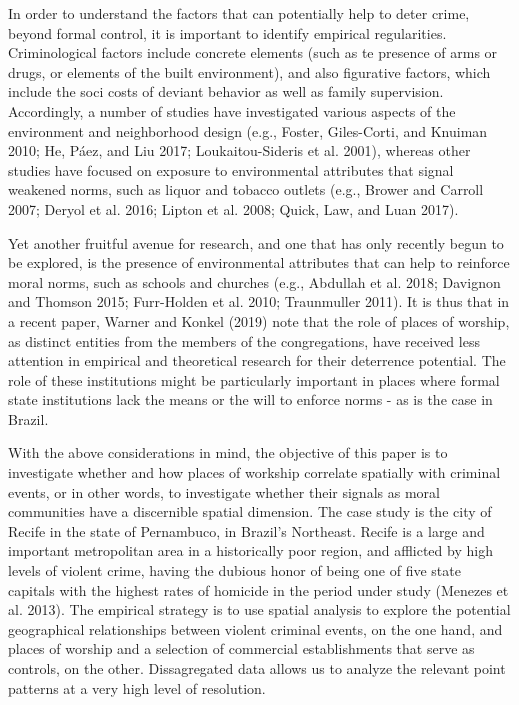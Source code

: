 \documentclass[smallextended]{svjour3}       %
\begin{document}
In order to understand the factors that can potentially help to deter
crime, beyond formal control, it is important to identify empirical
regularities. Criminological factors include concrete elements (such as
te presence of arms or drugs, or elements of the built environment), and
also figurative factors, which include the soci costs of deviant
behavior as well as family supervision. Accordingly, a number of studies
have investigated various aspects of the environment and neighborhood
design (e.g., Foster, Giles-Corti, and Knuiman 2010; He, Páez, and Liu
2017; Loukaitou-Sideris et al. 2001), whereas other studies have focused
on exposure to environmental attributes that signal weakened norms, such
as liquor and tobacco outlets (e.g., Brower and Carroll 2007; Deryol et
al. 2016; Lipton et al. 2008; Quick, Law, and Luan 2017).

Yet another fruitful avenue for research, and one that has only recently
begun to be explored, is the presence of environmental attributes that
can help to reinforce moral norms, such as schools and churches (e.g.,
Abdullah et al. 2018; Davignon and Thomson 2015; Furr-Holden et al.
2010; Traunmuller 2011). It is thus that in a recent paper, Warner and
Konkel (2019) note that the role of places of worship, as distinct
entities from the members of the congregations, have received less
attention in empirical and theoretical research for their deterrence
potential. The role of these institutions might be particularly
important in places where formal state institutions lack the means or
the will to enforce norms - as is the case in Brazil.

With the above considerations in mind, the objective of this paper is to
investigate whether and how places of workship correlate spatially with
criminal events, or in other words, to investigate whether their signals
as moral communities have a discernible spatial dimension. The case
study is the city of Recife in the state of Pernambuco, in Brazil's
Northeast. Recife is a large and important metropolitan area in a
historically poor region, and afflicted by high levels of violent crime,
having the dubious honor of being one of five state capitals with the
highest rates of homicide in the period under study (Menezes et al.
2013). The empirical strategy is to use spatial analysis to explore the
potential geographical relationships between violent criminal events, on
the one hand, and places of worship and a selection of commercial
establishments that serve as controls, on the other. Dissagregated data
allows us to analyze the relevant point patterns at a very high level of
resolution.
\end{document}
